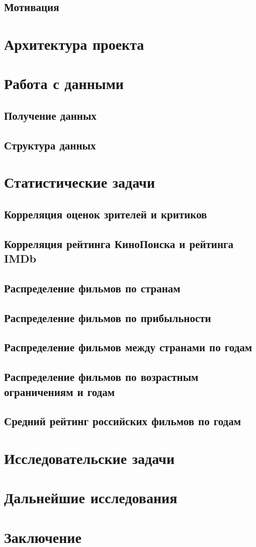 \documentclass[conference]{IEEEtran}
\begin{document}
\subsection{Мотивация}

\section{Архитектура проекта}

\section{Работа с данными}
\subsection{Получение данных}
\subsection{Структура данных}

\section{Статистические задачи}
\subsection{Корреляция оценок зрителей и критиков}
\subsection{Корреляция рейтинга КиноПоиска и рейтинга IMDb}
\subsection{Распределение фильмов по странам}
\subsection{Распределение фильмов по прибыльности}
\subsection{Распределение фильмов между странами по годам}
\subsection{Распределение фильмов по возрастным ограничениям и годам}
\subsection{Средний рейтинг российских фильмов по годам}

\section{Исследовательские задачи}

\section{Дальнейшие исследования}

\section{Заключение}
\end{document}
